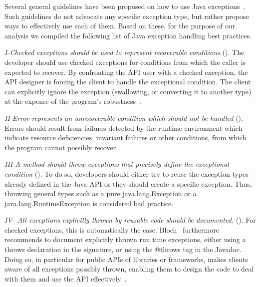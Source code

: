 \documentclass[conference]{IEEEtran}
\begin{document}
Several general guidelines have been proposed on how to use Java
exceptions~\cite{mandrioli1992advances,gosling2000java,wirfs2006toward,
bloch2008effective}. Such guidelines do not
advocate any specific exception type, but rather propose ways to effectively use each of them.
Based on these, for the purpose of our analysis we compiled the following list of Java exception handling best practices.


\emph{I-Checked exceptions should be used to represent recoverable
conditions} (\cite{mandrioli1992advances,gosling2000java,wirfs2006toward,bloch2008effective}).
The developer should use checked exceptions for conditions from which the caller
is expected to recover. By confronting the API user with a checked exception,
the API designer is forcing the client to handle the exceptional condition. The
client can explicitly ignore the exception (swallowing, or converting it to
another type) at the expense of the program's robustness~\cite{gosling2000java}.

\emph{II-Error represents an unrecoverable condition which should not be handled} 
(\cite{gosling2000java}).  Errors should result from failures detected
by the runtime environment which indicate resource deficiencies, invariant
failures or other conditions, from which the program cannot possibly recover.


\emph{III-A method should throw exceptions that precisely define the
exceptional condition} (\cite{gosling2000java,bloch2008effective}). To do so,
developers should either try to reuse the exception types already defined in the
Java API or they should create a specific exception. Thus, throwing general types such as a
pure java.lang.Exception or a java.lang.RuntimeException is considered bad practice.


\emph{IV- All exceptions explicitly thrown by reusable code should be documented.}
(\cite{mandrioli1992advances,gosling2000java,wirfs2006toward,bloch2008effective}).
For checked exceptions, this is automatically the case.
Bloch~\cite{bloch2008effective} furthermore recommends to document explicitly thrown
run time exceptions, either using a throws declaration in the signature, or using
the @throws tag in the Javadoc.
Doing so, in particular for public APIs of libraries or frameworks,
makes clients aware of all exceptions possibly thrown,
enabling them to design the code to deal with them and use the API effectively~\cite{Robil00,wirfs2006toward}.
\end{document}
